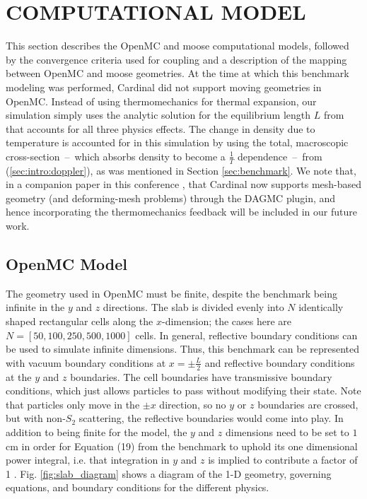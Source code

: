 \documentclass[letterpaper]{mc2023}
\begin{document}
\section{COMPUTATIONAL MODEL}\label{sec:model}
This section describes the OpenMC and \gls{moose} computational models, followed by the convergence criteria used for coupling 
and a description of the mapping between OpenMC and \gls{moose} geometries. At the time at which this benchmark modeling was
performed, Cardinal did not support moving geometries in OpenMC. Instead of using thermomechanics for thermal expansion, our
simulation simply uses the analytic solution for the equilibrium length $L$ from \cite{analytical-benchmark} that accounts for
all three physics effects. The change in density due to temperature is accounted for in this simulation by using the total,
macroscopic cross-section\ --\ which absorbs density to become a $\frac{1}{T}$ dependence\ --\ from (\ref{sec:intro:doppler}),
as was mentioned in Section \ref{sec:benchmark}. We note that, in a companion paper in this conference \cite{novak-2023}, that
Cardinal now supports mesh-based geometry (and deforming-mesh problems) through the DAGMC plugin, and hence incorporating the
thermomechanics feedback will be included in our future work.

\subsection{OpenMC Model}
\label{sec:model:OpenMC}
The geometry used in OpenMC must be finite, despite the benchmark being infinite in the $y$ and $z$ directions. The slab
is divided evenly into $N$ identically shaped rectangular cells along the $x$-dimension; the cases here are $N=[50,100,250,500,1000]$
cells. In general, reflective boundary conditions can be used to simulate infinite dimensions. Thus, this benchmark can be
represented with vacuum boundary conditions at $x=\pm \frac{L}{2}$ and reflective boundary conditions at the $y$ and $z$ boundaries.
The cell boundaries have transmissive boundary conditions, which just allows particles to pass without modifying their state.
Note that particles only move in the $\pm x$ direction, so no $y$ or $z$ boundaries are crossed, but with non-$S_{2}$ scattering,
the reflective boundaries would come into play. In addition to being finite for the model, the $y$ and $z$ dimensions need to be
set to $1$ cm in order for Equation (19) from the benchmark to uphold its one dimensional power integral, i.e. that integration in
$y$ and $z$ is implied to contribute a factor of 1 \cite{analytical-benchmark}. Fig. \ref{fig:slab_diagram} shows a diagram
of the 1-D geometry, governing equations, and boundary conditions for the different physics.
\end{document}
